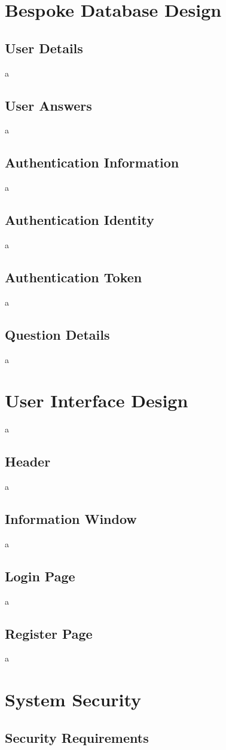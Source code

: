 \section{Bespoke Database Design}
\subsection{User Details}
a
\subsection{User Answers}
a
\subsection{Authentication Information}
a
\subsection{Authentication Identity}
a
\subsection{Authentication Token}
a
\subsection{Question Details}
a

\section{User Interface Design}
a
\subsection{Header}
a
\subsection{Information Window}
a
\subsection{Login Page}
a
\subsection{Register Page}
a

\section{System Security}
\subsection{Security Requirements}

